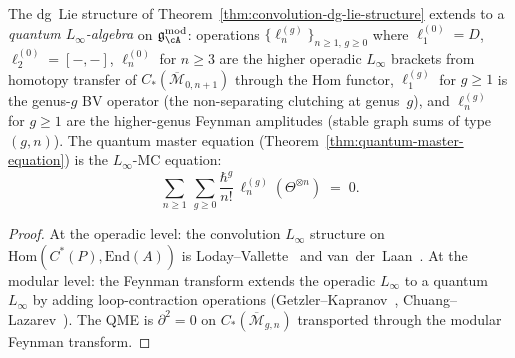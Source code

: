 \begin{theorem}
\label{thm:modular-quantum-linfty}
The dg~Lie structure of
Theorem~\textup{\ref{thm:convolution-dg-lie-structure}} extends to a
\emph{quantum $L_\infty$-algebra} on
$\mathfrak{g}_\cA^{\mathrm{mod}}$: operations
$\{\ell_n^{(g)}\}_{n \geq 1,\, g \geq 0}$ where
$\ell_1^{(0)} = D$, $\ell_2^{(0)} = [-,-]$,
$\ell_n^{(0)}$ for $n \geq 3$ are the higher operadic $L_\infty$
brackets from homotopy transfer of
$C_*(\overline{\mathcal{M}}_{0,n+1})$
through the Hom functor,
$\ell_1^{(g)}$ for $g \geq 1$ is the genus-$g$ BV operator
\textup{(}the non-separating clutching at genus~$g$\textup{)}, and
$\ell_n^{(g)}$ for $g \geq 1$ are the higher-genus Feynman amplitudes
\textup{(}stable graph sums of type $(g,n)$\textup{)}.  The quantum
master equation
\textup{(}Theorem~\textup{\ref{thm:quantum-master-equation})} is
the $L_\infty$-MC equation:
\begin{equation}\label{eq:quantum-linfty-mc}
\sum_{n \geq 1}\, \sum_{g \geq 0}
\frac{\hbar^g}{n!}\,
\ell_n^{(g)}(\Theta^{\otimes n})
\;=\; 0.
\end{equation}
\end{theorem}

\begin{proof}
At the operadic level: the convolution $L_\infty$ structure on
$\mathrm{Hom}(C^*(P), \mathrm{End}(A))$ is
Loday--Vallette~\cite[Theorem~10.3.8]{LV12} and
van~der~Laan~\cite{vdL03}.
At the modular level: the Feynman transform extends the operadic
$L_\infty$ to a quantum $L_\infty$ by adding loop-contraction
operations
(Getzler--Kapranov~\cite[\S5]{GeK98},
Chuang--Lazarev~\cite{CL10}).
The QME is $\partial^2 = 0$ on
$C_*(\overline{\mathcal{M}}_{g,n})$ transported through the
modular Feynman transform.
\end{proof}

